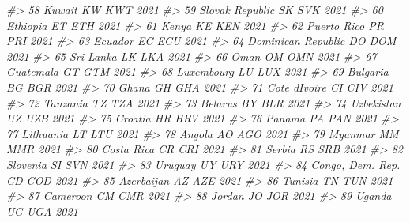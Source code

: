 \documentclass[
  xelatex, ja=standard]{bxjsbook}
\newenvironment{Shaded}{\begin{snugshade}}{\end{snugshade}}
\newcommand{\CommentTok}[1]{\textcolor[rgb]{0.56,0.35,0.01}{\textit{#1}}}
\theoremstyle{definition}
\theoremstyle{definition}
\theoremstyle{definition}
\theoremstyle{definition}
\theoremstyle{remark}
\begin{document}
\begin{Shaded}
\begin{Highlighting}[]
\CommentTok{\#\textgreater{} 58                          Kuwait    KW   KWT 2021}
\CommentTok{\#\textgreater{} 59                 Slovak Republic    SK   SVK 2021}
\CommentTok{\#\textgreater{} 60                        Ethiopia    ET   ETH 2021}
\CommentTok{\#\textgreater{} 61                           Kenya    KE   KEN 2021}
\CommentTok{\#\textgreater{} 62                     Puerto Rico    PR   PRI 2021}
\CommentTok{\#\textgreater{} 63                         Ecuador    EC   ECU 2021}
\CommentTok{\#\textgreater{} 64              Dominican Republic    DO   DOM 2021}
\CommentTok{\#\textgreater{} 65                       Sri Lanka    LK   LKA 2021}
\CommentTok{\#\textgreater{} 66                            Oman    OM   OMN 2021}
\CommentTok{\#\textgreater{} 67                       Guatemala    GT   GTM 2021}
\CommentTok{\#\textgreater{} 68                      Luxembourg    LU   LUX 2021}
\CommentTok{\#\textgreater{} 69                        Bulgaria    BG   BGR 2021}
\CommentTok{\#\textgreater{} 70                           Ghana    GH   GHA 2021}
\CommentTok{\#\textgreater{} 71                   Cote d\textquotesingle{}Ivoire    CI   CIV 2021}
\CommentTok{\#\textgreater{} 72                        Tanzania    TZ   TZA 2021}
\CommentTok{\#\textgreater{} 73                         Belarus    BY   BLR 2021}
\CommentTok{\#\textgreater{} 74                      Uzbekistan    UZ   UZB 2021}
\CommentTok{\#\textgreater{} 75                         Croatia    HR   HRV 2021}
\CommentTok{\#\textgreater{} 76                          Panama    PA   PAN 2021}
\CommentTok{\#\textgreater{} 77                       Lithuania    LT   LTU 2021}
\CommentTok{\#\textgreater{} 78                          Angola    AO   AGO 2021}
\CommentTok{\#\textgreater{} 79                         Myanmar    MM   MMR 2021}
\CommentTok{\#\textgreater{} 80                      Costa Rica    CR   CRI 2021}
\CommentTok{\#\textgreater{} 81                          Serbia    RS   SRB 2021}
\CommentTok{\#\textgreater{} 82                        Slovenia    SI   SVN 2021}
\CommentTok{\#\textgreater{} 83                         Uruguay    UY   URY 2021}
\CommentTok{\#\textgreater{} 84                Congo, Dem. Rep.    CD   COD 2021}
\CommentTok{\#\textgreater{} 85                      Azerbaijan    AZ   AZE 2021}
\CommentTok{\#\textgreater{} 86                         Tunisia    TN   TUN 2021}
\CommentTok{\#\textgreater{} 87                        Cameroon    CM   CMR 2021}
\CommentTok{\#\textgreater{} 88                          Jordan    JO   JOR 2021}
\CommentTok{\#\textgreater{} 89                          Uganda    UG   UGA 2021}

\end{Highlighting}
\end{Shaded}
\end{document}
